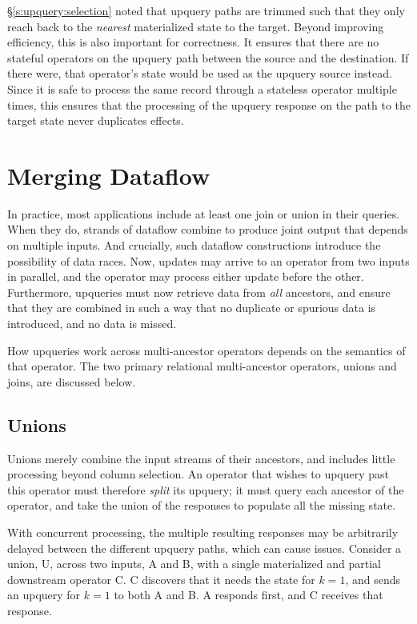 \S\ref{s:upquery:selection} noted that upquery paths are trimmed such that they
only reach back to the \emph{nearest} materialized state to the target. Beyond
improving efficiency, this is also important for correctness. It ensures that
there are no stateful operators on the upquery path between the source and the
destination. If there were, that operator's state would be used as the upquery
source instead. Since it is safe to process the same record through a stateless
operator multiple times, this ensures that the processing of the upquery
response on the path to the target state never duplicates effects.

\section{Merging Dataflow}

In practice, most applications include at least one join or union in their
queries. When they do, strands of dataflow combine to produce joint output that
depends on multiple inputs. And crucially, such dataflow constructions introduce
the possibility of data races. Now, updates may arrive to an operator from two
inputs in parallel, and the operator may process either update before the other.
Furthermore, upqueries must now retrieve data from \emph{all} ancestors, and
ensure that they are combined in such a way that no duplicate or spurious data
is introduced, and no data is missed.

How upqueries work across multi-ancestor operators depends on the semantics of
that operator. The two primary relational multi-ancestor operators, unions and
joins, are discussed below.

\subsection{Unions}
\label{s:upqueries:union}

Unions merely combine the input streams of their ancestors, and includes little
processing beyond column selection. An operator that wishes to upquery past this
operator must therefore \emph{split} its upquery; it must query each ancestor of
the operator, and take the union of the responses to populate all the missing
state.

With concurrent processing, the multiple resulting responses may be arbitrarily
delayed between the different upquery paths, which can cause issues. Consider
a union, U, across two inputs, A and B, with a single materialized and partial
downstream operator C. C discovers that it needs the state for $k = 1$, and
sends an upquery for $k = 1$ to both A and B. A responds first, and C receives
that response.

